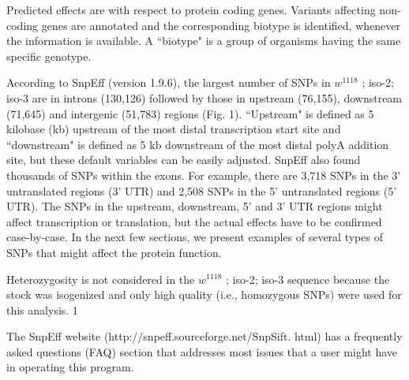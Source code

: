 Predicted effects are with respect to protein coding genes.  Variants affecting non-coding genes are annotated and the corresponding biotype is identified, whenever the information is available. A ``biotype" is a group of organisms having the same specific genotype.

According to SnpEff (version 1.9.6), the largest number of SNPs in $w^{1118}$ ; iso-2; iso-3 are in introns (130,126) followed by those in upstream (76,155), downstream (71,645) and intergenic (51,783) regions (Fig. 1). ``Upstream" is defined as 5 kilobase (kb) upstream of the most distal transcription start site and ``downstream" is defined as 5 kb downstream of the most distal polyA addition site, but these default variables can be easily adjusted.  SnpEff also found thousands of SNPs within the exons. For example, there are 3,718 SNPs in the 3' untranslated regions (3' UTR) and 2,508 SNPs in the 5' untranslated regions (5' UTR).  The SNPs in the upstream, downstream, 5' and 3' UTR regions might affect transcription or translation, but the actual effects have to be confirmed case-by-case. In the next few sections, we present examples of several types of SNPs that might affect the protein function.

Heterozygosity is not considered in the $w^{1118}$ ; iso-2; iso-3 sequence because the stock was isogenized and only high quality (i.e., homozygous SNPs) were used for this analysis. 1 

The SnpEff website (http://snpeff.sourceforge.net/SnpSift.  html) has a frequently asked questions (FAQ) section that addresses most issues that a user might have in operating this program.

